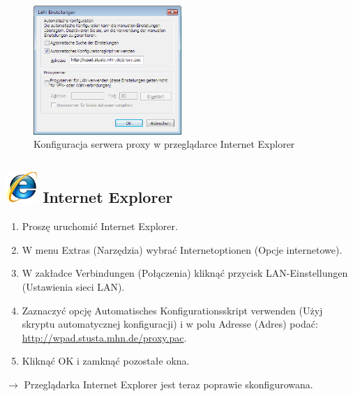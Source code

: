 \documentclass[a4paper,12pt]{scrartcl}
\begin{document}
\begin{figure}
  \begin{center}
    \includegraphics[width=0.5\textwidth,keepaspectratio]{Bilder/Proxy_IE}
  \end{center}
  \caption{Konfiguracja serwera proxy w przeglądarce Internet Explorer}
\end{figure}

\subsection*{\includegraphics[height=1.2cm,keepaspectratio]{Bilder/Internet_Explorer_7_Logo} Internet Explorer}
\begin{enumerate}
    \item Proszę uruchomić Internet Explorer.
    \item W menu Extras (Narzędzia) wybrać Internetoptionen (Opcje internetowe).
    \item W zakładce Verbindungen (Połączenia) kliknąć przycisk LAN-Einstellungen (Ustawienia sieci LAN).
    \item Zaznaczyć opcję  Automatisches Konfigurationsskript verwenden (Użyj skryptu automatycznej konfiguracji) i w polu Adresse (Adres) podać:\\ \url{http://wpad.stusta.mhn.de/proxy.pac}.
    \item Kliknąć OK i zamknąć pozostałe okna.
\end{enumerate}
$\rightarrow$ Przeglądarka Internet Explorer jest teraz poprawie skonfigurowana.
\end{document}

